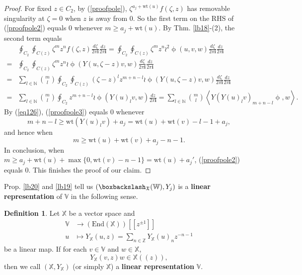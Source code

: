 \documentclass[11pt,b5paper,notitlepage]{article}
\theoremstyle{definition}
\newtheorem{df}{Definition}[section]
\theoremstyle{plain}
\newcommand{\End}{\mathrm{End}} %
\newcommand{\im}{\mathbf{i}}
\newcommand{\Vbb}{\mathbb V}
\newcommand{\Xbb}{\mathbb X}
\newcommand{\Wbb}{\mathbb W}
\newcommand{\Nbb}{\mathbb N}
\newcommand{\Zbb}{\mathbb Z}
\newcommand{\wt}{\mathrm{wt}}
\newcommand{\<}{\left\langle}
\renewcommand{\>}{\right\rangle}
\newcommand{\fx}{\mathfrak{X}}
\numberwithin{equation}{section}
\begin{document}
\begin{proof}
        For fixed $z\in C_2$, by (\ref{proofpole}), $\zeta^{a_j+\wt(u)}f(\zeta,z)$ has removable singularity at $\zeta=0$ when $z$ is away from $0$. So the first term on the RHS of (\ref{proofpole2}) equals $0$ whenever $m\geq a_j+\wt(u)$. By Thm. \ref{lb18}-(2), the second term equals
        \begin{align}
&\oint_{C_2}\oint_{C(z)}\zeta^m z^n f(\zeta,z)\frac{d\zeta}{2\pi\im} \frac{dz}{2\pi\im} =\oint_{C_2}\oint_{C(z)}\zeta^m z^n \wr^2 \upphi(u,v,w)\frac{d\zeta}{2\pi\im} \frac{dz}{2\pi\im}  \nonumber\\
            =&\oint_{C_2}\oint_{C(z)}\zeta^m z^n \wr \upphi(Y(u,\zeta-z)v,w)\frac{d\zeta}{2\pi\im} \frac{dz}{2\pi\im}  \nonumber\\
            =&\sum_{l\in \Nbb}\binom{m}{l}\oint_{C_2}\oint_{C(z)}(\zeta-z)^l z^{m+n-l} \wr \upphi(Y(u,\zeta-z)v,w)\frac{d\zeta}{2\pi\im} \frac{dz}{2\pi\im}  \nonumber\\
            =&\sum_{l\in \Nbb}\binom{m}{l}\oint_{C_2} z^{m+n-l} \wr \upphi(Y(u)_lv,w) \frac{dz}{2\pi\im} =\sum_{l\in \Nbb}\binom{m}{l} \<Y(Y(u)_lv)_{m+n-l}\upphi,w\>.   \label{proofpole3}
        \end{align}
        By (\ref{eq126}), (\ref{proofpole3}) equals $0$ whenever
        $$
        m+n-l\geq \wt(Y(u)_lv)+a_j=\wt(u)+\wt(v)-l-1+a_j,
        $$
        and hence when 
        $$
        m\geq \wt(u)+\wt(v)+a_j-n-1.
        $$
        In conclusion, when $m\geq a_j+\wt(u)+\max\{0,\wt(v)-n-1\}=\wt(u)+a_j'$, (\ref{proofpole2}) equals $0$. This finishes the proof of our claim.
    \end{proof}





Prop. \ref{lb20} and  \ref{lb19} tell us $(\boxbackslash_\fx(\Wbb),Y_j)$ is a \textbf{linear representation} of $\Vbb$ in the following sense.


    \begin{df}
    Let $\Xbb$ be a vector space and
$$
\begin{aligned}
    \Vbb&\rightarrow (\End(\Xbb))[[z^{\pm 1}]]\\
    u&\mapsto Y_\Xbb(u,z)=\sum_{n\in \Zbb}Y_\Xbb(u)_nz^{-n-1}
\end{aligned}
$$
be a linear map. If for each $v\in \Vbb$ and $w\in \Xbb$, 
$$
Y_\Xbb(v,z)w\in \Xbb((z)),
$$
then we call $(\Xbb,Y_\Xbb)$ (or simply $\Xbb$) a \textbf{linear representation} $\Vbb$.
    \end{df}
\end{document}

